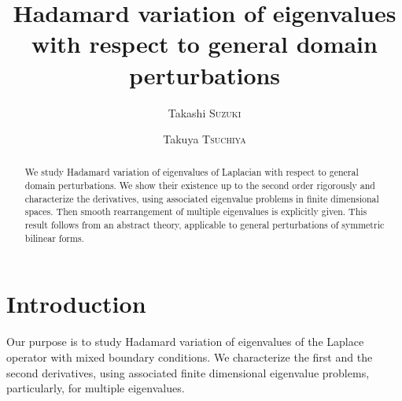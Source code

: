 \documentclass[final,a4paper]{jmsj}
\theoremstyle{thmstyleone}%
\theoremstyle{thmstyletwo}%
\theoremstyle{thmstylethree}%
\begin{document}
\title[Hadamard variation of eigenvalues]
{Hadamard variation of eigenvalues with
 respect to general domain perturbations}

\author{Takashi \textsc{Suzuki}}%
\address{Center of Mathematical Modeling and Data Science, \\
Osaka University, \\
Toyonaka, 560-8531, Japan}

\author{Takuya \textsc{Tsuchiya}}%
\address{Center of Mathematical Modeling and Data Science, \\
Osaka University, \\
Toyonaka, 560-8531, Japan}



\begin{abstract}
 We study Hadamard variation of eigenvalues of Laplacian with 
respect to general domain perturbations. We show their existence up to the 
second order rigorously and characterize the derivatives, using
associated eigenvalue problems in  finite dimensional spaces. Then smooth rearrangement of multiple eigenvalues is explicitly given. This
result follows from an abstract theory, applicable to general
perturbations of symmetric bilinear forms.
\end{abstract}


\maketitle

\section{Introduction}\label{sec1}  

Our purpose is to study Hadamard variation of eigenvalues of the Laplace operator with mixed boundary conditions. We characterize the first and the second derivatives, using associated finite dimensional eigenvalue problems, particularly, for multiple eigenvalues. 
\end{document}
